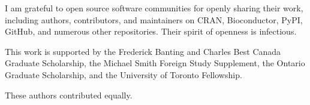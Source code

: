 \documentclass[12pt]{ut-thesis}
\begin{document}
\begin{preliminary}
\begin{acknowledgements}
I am grateful to open source software communities for openly sharing their work, including authors, contributors, and maintainers on CRAN, Bioconductor, PyPI, GitHub, and numerous other repositories. Their spirit of openness is infectious.

This work is supported by the Frederick Banting and Charles Best Canada Graduate Scholarship, the Michael Smith Foreign Study Supplement, the Ontario Graduate Scholarship, and the University of Toronto Fellowship.
\end{acknowledgements}

{
\singlespacing
\small
\setlength{\parskip}{0.1em}

\tableofcontents

\listoftables

\listoffigures

\glsaddall
\printglossary[type=\acronymtype,title=Abbreviations,nonumberlist]
}

\end{preliminary}








%





{
\singlespacing
\footnotesize

\bigskip
\high{*} These authors contributed equally.

\clearpage

}
\end{document}

